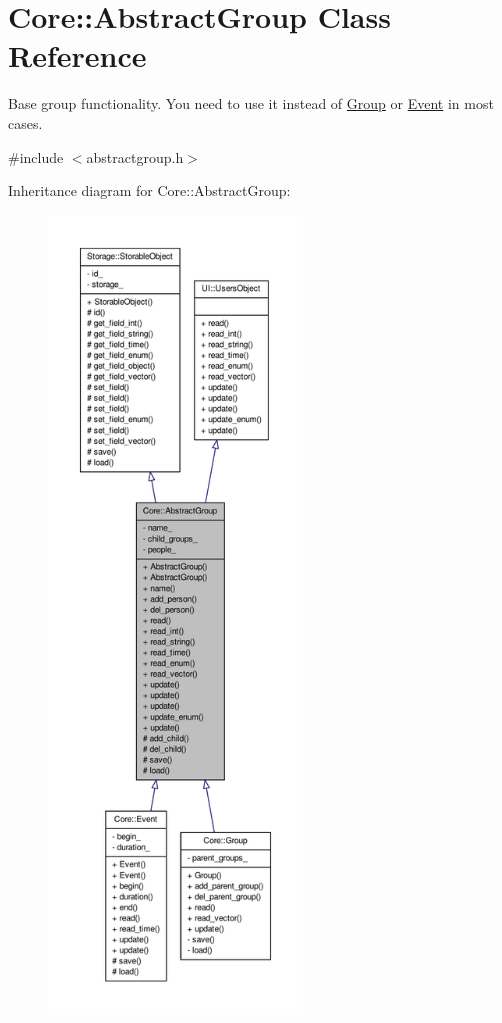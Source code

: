 \hypertarget{classCore_1_1AbstractGroup}{
\section{Core::AbstractGroup Class Reference}
\label{dd/d68/classCore_1_1AbstractGroup}
}


Base group functionality. You need to use it instead of \hyperlink{classCore_1_1Group}{Group} or \hyperlink{classCore_1_1Event}{Event} in most cases.  




{\ttfamily \#include $<$abstractgroup.h$>$}



Inheritance diagram for Core::AbstractGroup:
\nopagebreak
\begin{figure}[H]
\begin{center}
\leavevmode
\includegraphics[height=600pt]{d2/d03/classCore_1_1AbstractGroup__inherit__graph}
\end{center}
\end{figure}


